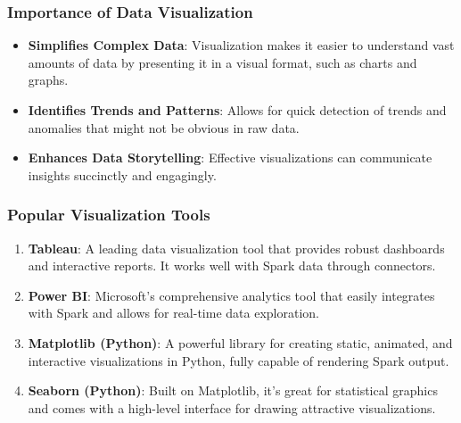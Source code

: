 \documentclass[aspectratio=169]{beamer}
\begin{document}
\begin{frame}[fragile]
    \frametitle{Importance of Data Visualization}
    \begin{itemize}
        \item \textbf{Simplifies Complex Data}: Visualization makes it easier to understand vast amounts of data by presenting it in a visual format, such as charts and graphs.
        \item \textbf{Identifies Trends and Patterns}: Allows for quick detection of trends and anomalies that might not be obvious in raw data.
        \item \textbf{Enhances Data Storytelling}: Effective visualizations can communicate insights succinctly and engagingly.
    \end{itemize}
\end{frame}

\begin{frame}[fragile]
    \frametitle{Popular Visualization Tools}
    \begin{enumerate}
        \item \textbf{Tableau}: A leading data visualization tool that provides robust dashboards and interactive reports. It works well with Spark data through connectors.
        \item \textbf{Power BI}: Microsoft's comprehensive analytics tool that easily integrates with Spark and allows for real-time data exploration.
        \item \textbf{Matplotlib (Python)}: A powerful library for creating static, animated, and interactive visualizations in Python, fully capable of rendering Spark output.
        \item \textbf{Seaborn (Python)}: Built on Matplotlib, it's great for statistical graphics and comes with a high-level interface for drawing attractive visualizations.
    \end{enumerate}
\end{frame}
\end{document}
